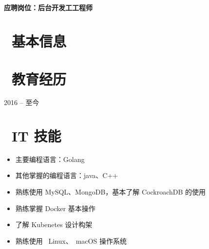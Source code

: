 \documentclass{resume}
\begin{document}

  \hfill \vspace{2mm} \par
\textbf{应聘岗位：后台开发⼯工程师}

\section{\faInfo\ 基本信息} \vspace{1mm}

{\phone {} \qquad\qquad\quad
\email {}
\vspace{2mm} \par
\github {} \qquad
\faLink {}}

\section{\faGraduationCap\ 教育经历} \vspace{1mm}

 {2016 -- 至今}

\section{\faCogs\ IT 技能} \vspace{1mm}

\begin{itemize}[parsep=1ex]
  \item 主要编程语言：Golang
  \item 其他掌握的编程语言：java、C++
  \item 熟练使⽤ MySQL、MongoDB，基本了解 CockroachDB 的使用
  \item 熟练掌握 Docker 基本操作
  \item 了解 Kubenetes 设计构架
  \item 熟练使⽤ \faLinux\ {Linux}、\faApple\ {macOS} 操作系统
\end{itemize}
\end{document}

